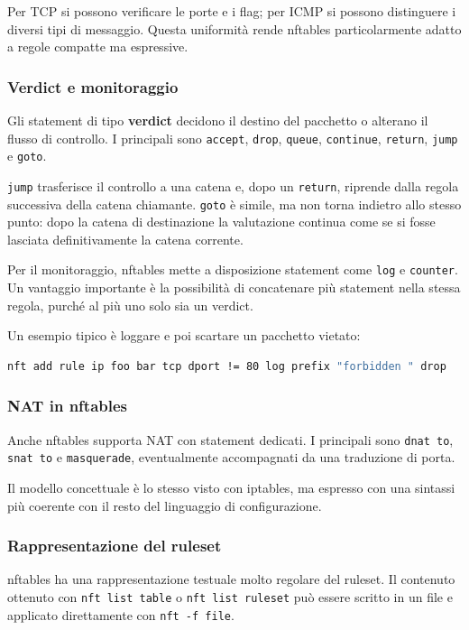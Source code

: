\documentclass[12pt, a4paper]{report}
\begin{document}
Per TCP si possono verificare le porte e i flag; per ICMP si possono distinguere i diversi tipi di messaggio. Questa uniformità rende nftables particolarmente adatto a regole compatte ma espressive.

\subsubsection{Verdict e monitoraggio}
Gli statement di tipo \textbf{verdict} decidono il destino del pacchetto o alterano il flusso di controllo. I principali sono \texttt{accept}, \texttt{drop}, \texttt{queue}, \texttt{continue}, \texttt{return}, \texttt{jump} e \texttt{goto}.

\texttt{jump} trasferisce il controllo a una catena e, dopo un \texttt{return}, riprende dalla regola successiva della catena chiamante. \texttt{goto} è simile, ma non torna indietro allo stesso punto: dopo la catena di destinazione la valutazione continua come se si fosse lasciata definitivamente la catena corrente.

Per il monitoraggio, nftables mette a disposizione statement come \texttt{log} e \texttt{counter}. Un vantaggio importante è la possibilità di concatenare più statement nella stessa regola, purché al più uno solo sia un verdict.

Un esempio tipico è loggare e poi scartare un pacchetto vietato:
\begin{lstlisting}[language=bash]
	nft add rule ip foo bar tcp dport != 80 log prefix "forbidden " drop
\end{lstlisting}

\subsubsection{NAT in nftables}
Anche nftables supporta NAT con statement dedicati. I principali sono \texttt{dnat to}, \texttt{snat to} e \texttt{masquerade}, eventualmente accompagnati da una traduzione di porta.

Il modello concettuale è lo stesso visto con iptables, ma espresso con una sintassi più coerente con il resto del linguaggio di configurazione.

\subsubsection{Rappresentazione del ruleset}
nftables ha una rappresentazione testuale molto regolare del ruleset. Il contenuto ottenuto con \texttt{nft list table} o \texttt{nft list ruleset} può essere scritto in un file e applicato direttamente con \texttt{nft -f file}.
\end{document}
